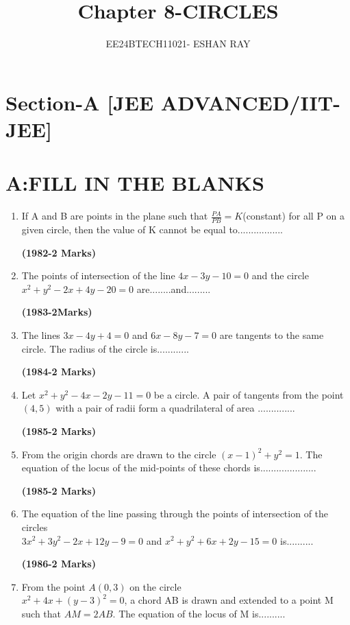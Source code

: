\documentclass[journal,12pt,twocolumn]{IEEEtran}
\theoremstyle{remark}
\begin{document}

\vspace{3cm}

\title{Chapter 8-CIRCLES}
\author{EE24BTECH11021- ESHAN RAY}
\maketitle
\newpage
\bigskip
\section*{Section-A [JEE ADVANCED/IIT-JEE]}
\section*{A:FILL IN THE BLANKS}
\begin{enumerate}
    

\item If A and B are points in the plane such that        $\frac{PA}{PB}=K$(constant) for all P on a given circle, then the value of K cannot be equal to................. 

\hfill{\textbf{(1982-2 Marks)}} 
\item The points of intersection of the line $4x-3y-10=0$ and the circle $x^{2}+y^{2}-2x+4y-20=0$ are........and.........      

\hfill{\textbf{(1983-2Marks)}}
\item The lines $3x-4y+4=0$ and $6x-8y-7=0$ are tangents to the same circle. The radius of the circle is............ 

\hfill{\textbf{(1984-2 Marks)}}
\item Let $x^{2}+y^{2}-4x-2y-11=0$ be a circle. A pair of tangents from the point $(4,5)$ with a pair of radii form a quadrilateral of area ..............  

\hfill{\textbf{(1985-2 Marks)}}
\item From the origin chords are drawn  to the circle $(x-1)^{2}+y^{2}=1$. The equation of the locus of the mid-points of these chords is..................... 

\hfill{\textbf{(1985-2 Marks)}}
\item The equation of the line passing through the points of intersection of the circles\\ $3x^{2}+3y^{2}-2x+12y-9=0$ and $x^{2}+y^{2}+6x+2y-15=0$ is.......... 

\hfill{\textbf{(1986-2 Marks)}}
\item From the point $A(0,3)$ on the circle \\            $x^{2}+4x+(y-3)^{2}=0$, a chord AB is drawn and extended to a point M such that $AM=2AB$. The equation of the locus of M is.......... 


\end{enumerate}
\end{document}
